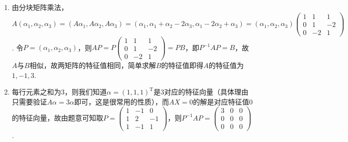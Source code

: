 \begin{enumerate}
    \item 由分块矩阵乘法，$A(\alpha_1,\alpha_2,\alpha_3)=(A\alpha_1,A\alpha_2,A\alpha_3)=(\alpha_1,\alpha_1+\alpha_2-2\alpha_3,\alpha_1-2\alpha_2+\alpha_3)=(\alpha_1,\alpha_2,\alpha_3)\begin{pmatrix}
        1 & 1 & 1 \\ 0 & 1 & -2 \\ 0 & -2 & 1
    \end{pmatrix}$. 令$P=(\alpha_1,\alpha_2,\alpha_3)$，则$AP=P\begin{pmatrix}
        1 & 1 & 1 \\ 0 & 1 & -2 \\ 0 & -2 & 1
    \end{pmatrix}=PB$，即$P^{-1}AP=B$，故$A$与$B$相似，故两矩阵的特征值相同，简单求解$B$的特征值即得$A$的特征值为$1,-1,3$.

    \item 每行元素之和为3，则我们知道$\alpha=(1,1,1)^\mathrm{T}$是3对应的特征向量（具体理由只需要验证$A\alpha=3\alpha$即可，这是很常用的性质），而$AX=0$的解是对应特征值0的特征向量，故由题意可知取$P=\begin{pmatrix}
        1 & -1 & 0 \\ 1 & 2 & -1 \\ 1 & -1 & 1
    \end{pmatrix}$，则$P^{-1}AP=\begin{pmatrix}
        3 & 0 & 0 \\ 0 & 0 & 0 \\ 0 & 0 & 0
    \end{pmatrix}$.
\end{enumerate}

